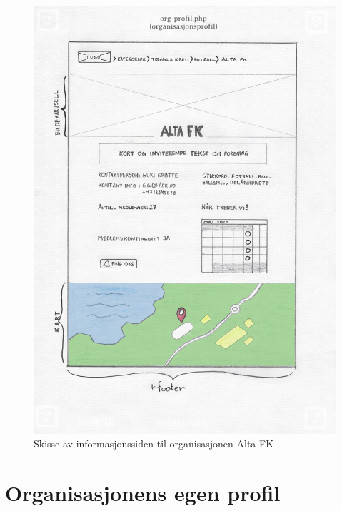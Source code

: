 \begin{figure}[H]
\centering
\includegraphics[width=.9\textwidth]{Illustrasjoner/Skisser-pdf/1.0/1-13-organisasjonsside.pdf}
\caption{Skisse av informasjonssiden til organisasjonen Alta FK}
\label{vedlegg:1-13-organisasjonsside}
\end{figure}

\section{Organisasjonens egen profil}

